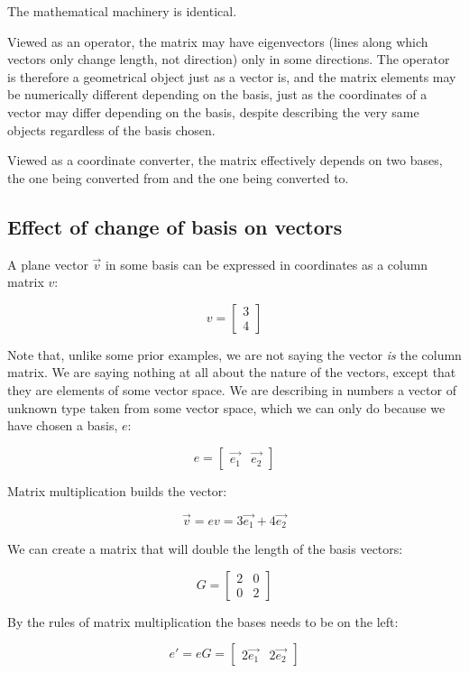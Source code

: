 The mathematical machinery is identical.

Viewed as an operator, the matrix may have eigenvectors (lines along which vectors only change length, not direction) only in some directions. The operator is therefore a geometrical object just as a vector is, and the matrix elements may be numerically different depending on the basis, just as the coordinates of a vector may differ depending on the basis, despite describing the very same objects regardless of the basis chosen.

Viewed as a coordinate converter, the matrix effectively depends on two bases, the one being converted from and the one being converted to.

\subsection{Effect of change of basis on vectors}

A plane vector $\vec{v}$ in some basis can be expressed in coordinates as a column matrix $v$:

$$v = \begin{bmatrix}3 \\ 4\end{bmatrix}$$

Note that, unlike some prior examples, we are not saying the vector \textit{is} the column matrix. We are saying nothing at all about the nature of the vectors, except that they are elements of some vector space. We are describing in numbers a vector of unknown type taken from some vector space, which we can only do because we have chosen a basis, $e$:

$$e = \begin{bmatrix}\vec{e_1} & \vec{e_2}\end{bmatrix}$$

Matrix multiplication builds the vector:

$$\vec{v} = ev = 3\vec{e_1} + 4\vec{e_2}$$

We can create a matrix that will double the length of the basis vectors:

$$G = \begin{bmatrix}2 & 0 \\ 0 & 2\end{bmatrix}$$

By the rules of matrix multiplication the bases needs to be on the left:

$$e' = eG = \begin{bmatrix}2\vec{e_1} & 2\vec{e_2}\end{bmatrix}$$

